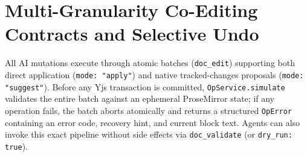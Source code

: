 \documentclass[11pt,a4paper]{article}
\begin{document}
\section{Multi-Granularity Co-Editing Contracts and Selective Undo}
\label{sec:contracts}

All AI mutations execute through atomic batches (\texttt{doc\_edit}) supporting both direct application (\texttt{mode: "apply"}) and native tracked-changes proposals (\texttt{mode: "suggest"}). Before any Yjs transaction is committed, \texttt{OpService.simulate} validates the entire batch against an ephemeral ProseMirror state; if any operation fails, the batch aborts atomically and returns a structured \texttt{OpError} containing an error code, recovery hint, and current block text. Agents can also invoke this exact pipeline without side effects via \texttt{doc\_validate} (or \texttt{dry\_run: true}).
\end{document}
